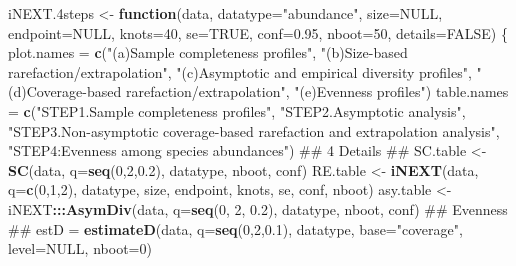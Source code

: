 \documentclass[]{article}
\newenvironment{Shaded}{\begin{snugshade}}{\end{snugshade}}
\newcommand{\KeywordTok}[1]{\textcolor[rgb]{0.13,0.29,0.53}{\textbf{#1}}}
\newcommand{\DataTypeTok}[1]{\textcolor[rgb]{0.13,0.29,0.53}{#1}}
\newcommand{\DecValTok}[1]{\textcolor[rgb]{0.00,0.00,0.81}{#1}}
\newcommand{\FloatTok}[1]{\textcolor[rgb]{0.00,0.00,0.81}{#1}}
\newcommand{\StringTok}[1]{\textcolor[rgb]{0.31,0.60,0.02}{#1}}
\newcommand{\OtherTok}[1]{\textcolor[rgb]{0.56,0.35,0.01}{#1}}
\newcommand{\ControlFlowTok}[1]{\textcolor[rgb]{0.13,0.29,0.53}{\textbf{#1}}}
\newcommand{\OperatorTok}[1]{\textcolor[rgb]{0.81,0.36,0.00}{\textbf{#1}}}
\newcommand{\NormalTok}[1]{#1}
\begin{document}
\begin{Shaded}
\begin{Highlighting}[]
\NormalTok{iNEXT.4steps <-}\StringTok{ }\ControlFlowTok{function}\NormalTok{(data, }\DataTypeTok{datatype=}\StringTok{"abundance"}\NormalTok{, }\DataTypeTok{size=}\OtherTok{NULL}\NormalTok{, }\DataTypeTok{endpoint=}\OtherTok{NULL}\NormalTok{,}
                         \DataTypeTok{knots=}\DecValTok{40}\NormalTok{, }\DataTypeTok{se=}\OtherTok{TRUE}\NormalTok{, }\DataTypeTok{conf=}\FloatTok{0.95}\NormalTok{, }\DataTypeTok{nboot=}\DecValTok{50}\NormalTok{, }\DataTypeTok{details=}\OtherTok{FALSE}\NormalTok{) \{}
\NormalTok{  plot.names =}\StringTok{ }\KeywordTok{c}\NormalTok{(}\StringTok{"(a)Sample completeness profiles"}\NormalTok{,}
                 \StringTok{"(b)Size-based rarefaction/extrapolation"}\NormalTok{,}
                 \StringTok{"(c)Asymptotic and empirical diversity profiles"}\NormalTok{,}
                 \StringTok{"(d)Coverage-based rarefaction/extrapolation"}\NormalTok{,}
                 \StringTok{"(e)Evenness profiles"}\NormalTok{)}
\NormalTok{  table.names =}\StringTok{ }\KeywordTok{c}\NormalTok{(}\StringTok{"STEP1.Sample completeness profiles"}\NormalTok{,}
                  \StringTok{"STEP2.Asymptotic analysis"}\NormalTok{,}
                  \StringTok{"STEP3.Non-asymptotic coverage-based rarefaction and extrapolation analysis"}\NormalTok{,}
                  \StringTok{"STEP4:Evenness among species abundances"}\NormalTok{)}
\NormalTok{  ## 4 Details ##}
\NormalTok{  SC.table <-}\StringTok{ }\KeywordTok{SC}\NormalTok{(data, }\DataTypeTok{q=}\KeywordTok{seq}\NormalTok{(}\DecValTok{0}\NormalTok{,}\DecValTok{2}\NormalTok{,}\FloatTok{0.2}\NormalTok{), datatype, nboot, conf)}
\NormalTok{  RE.table <-}\StringTok{ }\KeywordTok{iNEXT}\NormalTok{(data, }\DataTypeTok{q=}\KeywordTok{c}\NormalTok{(}\DecValTok{0}\NormalTok{,}\DecValTok{1}\NormalTok{,}\DecValTok{2}\NormalTok{), datatype, size, endpoint, knots, se, conf, nboot)}
\NormalTok{  asy.table <-}\StringTok{ }\NormalTok{iNEXT}\OperatorTok{:::}\KeywordTok{AsymDiv}\NormalTok{(data, }\DataTypeTok{q=}\KeywordTok{seq}\NormalTok{(}\DecValTok{0}\NormalTok{, }\DecValTok{2}\NormalTok{, }\FloatTok{0.2}\NormalTok{), datatype, nboot, conf)}
\NormalTok{  ## Evenness ##}
\NormalTok{  estD =}\StringTok{ }\KeywordTok{estimateD}\NormalTok{(data, }\DataTypeTok{q=}\KeywordTok{seq}\NormalTok{(}\DecValTok{0}\NormalTok{,}\DecValTok{2}\NormalTok{,}\FloatTok{0.1}\NormalTok{), datatype, }\DataTypeTok{base=}\StringTok{"coverage"}\NormalTok{, }\DataTypeTok{level=}\OtherTok{NULL}\NormalTok{, }\DataTypeTok{nboot=}\DecValTok{0}\NormalTok{)}

\end{Highlighting}
\end{Shaded}
\end{document}
